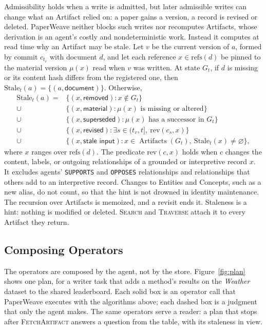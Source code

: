 \documentclass[sigconf,review,anonymous]{acmart}
\begin{document}
Admissibility holds when a write is admitted, but later admissible writes can
change what an Artifact relied on: a paper gains a version, a record is
revised or deleted. PaperWeave neither blocks such writes nor recomputes
Artifacts, whose derivation is an agent's costly and nondeterministic work.
Instead it computes at read time why an Artifact may be stale. Let $v$ be the
current version of $a$, formed by commit $c_{t_v}$ with document $d$, and let
each reference $x\in\mathrm{refs}(d)$ be pinned to the material version
$\mu(x)$ read when $v$ was written. At state $G_t$, if $d$ is missing or its
content hash differs from the registered one, then
$\mathrm{Stale}_t(a)=\{(a,\textsf{document})\}$. Otherwise,
\begin{equation}
\label{eq:stale}
\begin{aligned}
\mathrm{Stale}_t(a) ={}
  &\{(x,\textsf{removed}) : x\notin G_t\}\\
  \cup\ &\{(x,\textsf{material}) : \mu(x)\text{ is missing or altered}\}\\
  \cup\ &\{(x,\textsf{superseded}) : \mu(x)\text{ has a successor in }G_t\}\\
  \cup\ &\{(x,\textsf{revised}) : \exists s\in(t_v,t],\
    \mathrm{rev}(c_s,x)\}\\
  \cup\ &\{(x,\textsf{stale input}) : x\in\operatorname{Artifacts}(G_t),\
    \mathrm{Stale}_t(x)\ne\varnothing\},
\end{aligned}
\end{equation}
where $x$ ranges over $\mathrm{refs}(d)$. The predicate $\mathrm{rev}(c,x)$
holds when $c$ changes the content, labels, or outgoing relationships of a
grounded or interpretive record $x$. It excludes agents' \texttt{SUPPORTS} and
\texttt{OPPOSES} relationships and relationships that others add to an
interpretive record. Changes to Entities and Concepts, such as a new alias, do
not count, so that the hint is not drowned in identity maintenance. The
recursion over Artifacts is memoized, and a revisit ends it. Staleness is a
hint: nothing is modified or deleted. \textsc{Search} and \textsc{Traverse}
attach it to every Artifact they return.

\subsection{Composing Operators}
\label{sec:composition-draft}

The operators are composed by the agent, not by the store.
Figure~\ref{fig:plan} shows one plan, for a writer task that adds a method's
results on the \emph{Weather} dataset to the shared leaderboard. Each solid
box is an operator call that PaperWeave executes with the algorithms above;
each dashed box is a judgment that only the agent makes. The same operators
serve a reader: a plan that stops after \textsc{FetchArtifact} answers a
question from the table, with its staleness in view.
\end{document}
